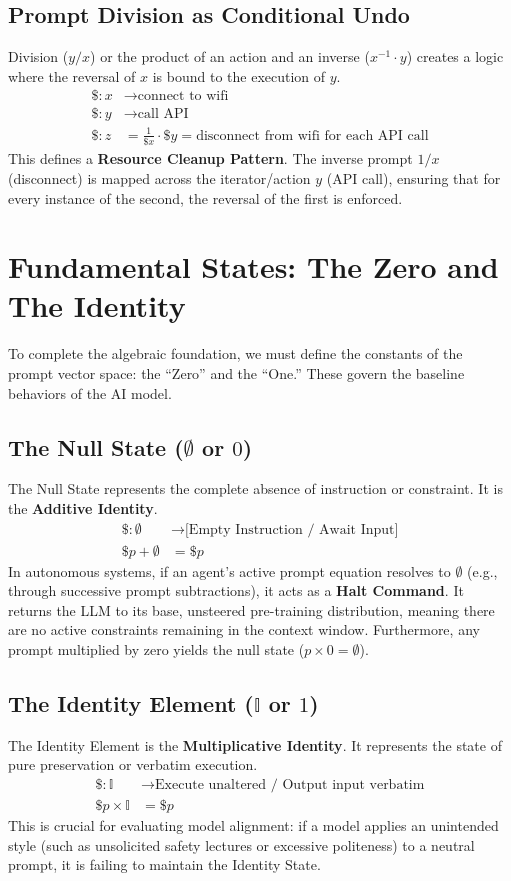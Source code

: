 \documentclass[11pt, a4paper]{article}
\begin{document}
\subsection{Prompt Division as Conditional Undo}
Division ($y/x$) or the product of an action and an inverse ($x^{-1} \cdot y$) creates a logic where the reversal of $x$ is bound to the execution of $y$.
\begin{align*}
    \$: x &\rightarrow \text{connect to wifi} \\
    \$: y &\rightarrow \text{call API} \\
    \$: z &= \frac{1}{\$x} \cdot \$y = \text{disconnect from wifi for each API call}
\end{align*}
This defines a \textbf{Resource Cleanup Pattern}. The inverse prompt $1/x$ (disconnect) is mapped across the iterator/action $y$ (API call), ensuring that for every instance of the second, the reversal of the first is enforced.

\section{Fundamental States: The Zero and The Identity}
To complete the algebraic foundation, we must define the constants of the prompt vector space: the ``Zero'' and the ``One.'' These govern the baseline behaviors of the AI model.

\subsection{The Null State ($\emptyset$ or $0$)}
The Null State represents the complete absence of instruction or constraint. It is the \textbf{Additive Identity}.
\begin{align*}
    \$: \emptyset &\rightarrow \text{[Empty Instruction / Await Input]} \\
    \$p + \emptyset &= \$p
\end{align*}
In autonomous systems, if an agent's active prompt equation resolves to $\emptyset$ (e.g., through successive prompt subtractions), it acts as a \textbf{Halt Command}. It returns the LLM to its base, unsteered pre-training distribution, meaning there are no active constraints remaining in the context window. Furthermore, any prompt multiplied by zero yields the null state ($p \times 0 = \emptyset$).

\subsection{The Identity Element ($\mathbb{I}$ or $1$)}
The Identity Element is the \textbf{Multiplicative Identity}. It represents the state of pure preservation or verbatim execution.
\begin{align*}
    \$: \mathbb{I} &\rightarrow \text{Execute unaltered / Output input verbatim} \\
    \$p \times \mathbb{I} &= \$p
\end{align*}
This is crucial for evaluating model alignment: if a model applies an unintended style (such as unsolicited safety lectures or excessive politeness) to a neutral prompt, it is failing to maintain the Identity State.
\end{document}
